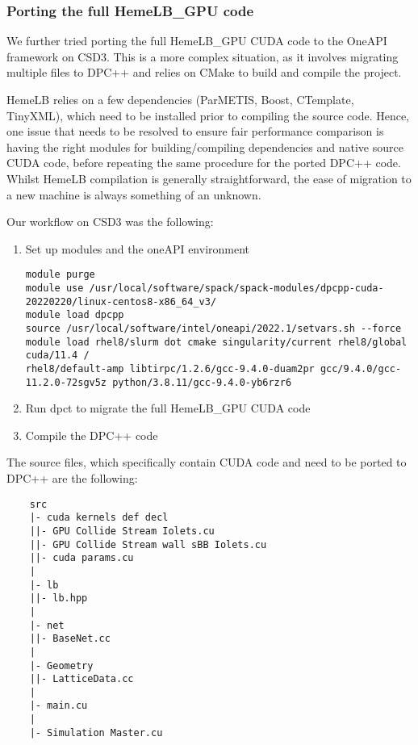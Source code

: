 \documentclass[../main]{subfiles}
\begin{document}
\subsubsection{Porting the full HemeLB\_GPU code}
We further tried porting the full HemeLB\_GPU CUDA code to the OneAPI framework on CSD3. This is a more complex situation, as it involves migrating multiple files to DPC++ and relies on CMake to build and compile the project.

HemeLB relies on a few dependencies (ParMETIS, Boost, CTemplate, TinyXML), which need to be installed prior to compiling the source code.
Hence, one issue that needs to be resolved to ensure fair performance comparison is having the right modules for building/compiling dependencies and native source CUDA code, before repeating the same procedure for the ported DPC++ code.
Whilst HemeLB compilation is generally straightforward, the ease of migration to a new machine is always something of an unknown.

Our workflow on CSD3 was the following:
\begin{enumerate}
	\item Set up modules and the oneAPI environment
	      \begin{verbatim}
module purge
module use /usr/local/software/spack/spack-modules/dpcpp-cuda-20220220/linux-centos8-x86_64_v3/
module load dpcpp
source /usr/local/software/intel/oneapi/2022.1/setvars.sh --force
module load rhel8/slurm dot cmake singularity/current rhel8/global cuda/11.4 /
rhel8/default-amp libtirpc/1.2.6/gcc-9.4.0-duam2pr gcc/9.4.0/gcc-11.2.0-72sgv5z python/3.8.11/gcc-9.4.0-yb6rzr6
    \end{verbatim}
	\item Run dpct to migrate the full HemeLB\_GPU CUDA code
	\item Compile the DPC++ code
\end{enumerate}


The source files, which specifically contain CUDA code and need to be ported to DPC++ are the following:
\begin{verbatim}
    src
    |- cuda kernels def decl
    ||- GPU Collide Stream Iolets.cu
    ||- GPU Collide Stream wall sBB Iolets.cu
    ||- cuda params.cu
    |
    |- lb
    ||- lb.hpp
    |
    |- net
    ||- BaseNet.cc
    |
    |- Geometry
    ||- LatticeData.cc
    |
    |- main.cu
    |
    |- Simulation Master.cu
\end{verbatim}
\end{document}
